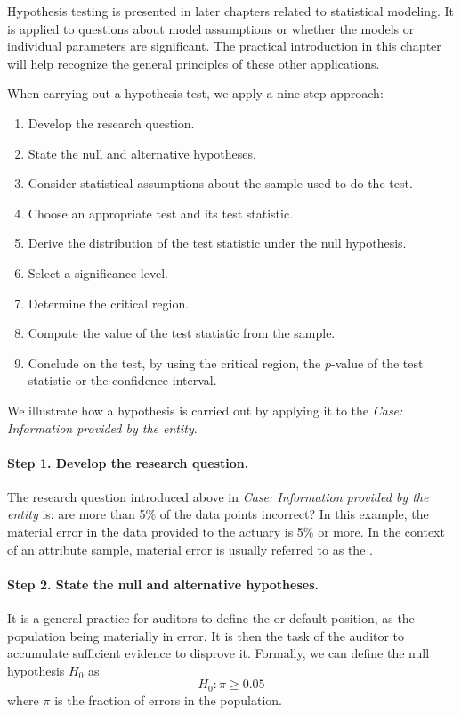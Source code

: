 \bigskip 
Hypothesis testing is presented in later chapters related to statistical modeling. It is applied to questions about model assumptions or whether the models or individual parameters are significant. The practical introduction in this chapter will help recognize the general principles of these other applications.

\bigskip 
When carrying out a hypothesis test, we apply a nine-step approach:
\begin{enumerate}[leftmargin=*,labelsep=.5em]
\item Develop the research question.
\item State the null and alternative hypotheses.
\item Consider statistical assumptions about the sample used to do the test.
\item Choose an appropriate test and its test statistic.
\item Derive the distribution of the test statistic under the null hypothesis.
\item Select a significance level.
\item Determine the critical region.
\item Compute the value of the test statistic from the sample.
\item Conclude on the test, by using the critical region, the $p$-value of the test statistic or the confidence interval.
\end{enumerate}

We illustrate how a hypothesis is carried out by applying it to the \emph{Case: Information provided by the entity}. 

\paragraph{Step 1. Develop the research question.} The research question introduced above in \emph{Case: Information provided by the entity} is: are more than 5\% of the data points incorrect? In this example, the material error in the data provided to the actuary is 5\% or more. In the context of an attribute sample, material error is usually referred to as the .

\paragraph{Step 2. State the null and alternative hypotheses.} It is a general practice for auditors to define the  or default position, as the population being materially in error. It is then the task of the auditor to accumulate sufficient evidence to disprove it. Formally, we can define the null hypothesis $H_0$ as
\begin{equation*}
H_0 : \pi \geq 0.05
\end{equation*}
where $\pi$ is the fraction of errors in the population.

